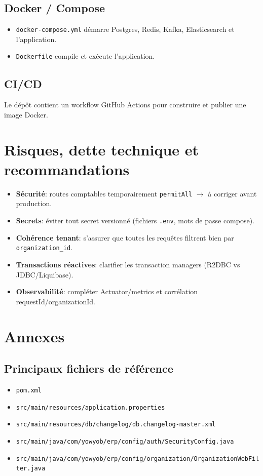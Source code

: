 \documentclass[12pt,a4paper]{report}
\begin{document}
\section{Docker / Compose}
\begin{itemize}
  \item \texttt{docker-compose.yml} démarre Postgres, Redis, Kafka, Elasticsearch et l'application.
  \item \texttt{Dockerfile} compile et exécute l'application.
\end{itemize}

\section{CI/CD}
Le dépôt contient un workflow GitHub Actions pour construire et publier une image Docker.

\chapter{Risques, dette technique et recommandations}
\begin{itemize}
  \item \textbf{Sécurité}: routes comptables temporairement \texttt{permitAll} \(\rightarrow\) à corriger avant production.
  \item \textbf{Secrets}: éviter tout secret versionné (fichiers \texttt{.env}, mots de passe compose).
  \item \textbf{Cohérence tenant}: s'assurer que toutes les requêtes filtrent bien par \texttt{organization\_id}.
  \item \textbf{Transactions réactives}: clarifier les transaction managers (R2DBC vs JDBC/Liquibase).
  \item \textbf{Observabilité}: compléter Actuator/metrics et corrélation requestId/organizationId.
\end{itemize}

\appendix
\chapter{Annexes}


\section{Principaux fichiers de référence}
\begin{itemize}
  \item \texttt{pom.xml}
  \item \texttt{src/main/resources/application.properties}
  \item \texttt{src/main/resources/db/changelog/db.changelog-master.xml}
  \item \texttt{src/main/java/com/yowyob/erp/config/auth/SecurityConfig.java}
  \item \texttt{src/main/java/com/yowyob/erp/config/organization/OrganizationWebFilter.java}
\end{itemize}
\end{document}
